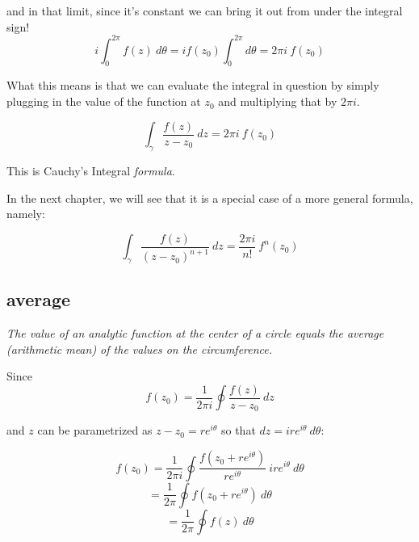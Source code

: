 \documentclass[11pt, oneside]{article}
\begin{document}
and in that limit, since it's constant we can bring it out from under the integral sign!
\[ i \int_0^{2\pi}  f(z) \ d \theta = i f(z_0) \int_0^{2\pi} d \theta = 2 \pi i \ f(z_0) \]

What this means is that we can evaluate the integral in question by simply plugging in the value of the function at $z_0$ and multiplying that by $2 \pi i$.

\[ \int_{\gamma} \frac{f(z)}{z - z_0} \ dz = 2 \pi i \ f(z_0) \]

This is Cauchy's Integral \emph{formula}.

In the next chapter, we will see that it is a special case of a more general formula, namely:

\[ \int_{\gamma} \frac{f(z)}{(z - z_0)^{n+1}} \ dz = \frac{2 \pi i}{n!} \ f^{n} (z_0) \]

\subsection*{average}

\emph{The value of an analytic function at the center of a circle equals the average (arithmetic mean) of the values on the circumference.}

Since
\[ f(z_0) = \frac{1}{2 \pi i} \oint \frac{f(z)}{z - z_0} \ dz \]

and $z$ can be parametrized as $z - z_0 = re^{i \theta}$ so that $dz = i r e^{i \theta} \ d \theta$:

\[ f(z_0) = \frac{1}{2 \pi i} \oint \frac{f(z_0 + re^{i \theta})}{re^{i \theta} } \ i r e^{i \theta} \ d \theta \]
\[ = \frac{1}{2 \pi} \oint f(z_0 + re^{i \theta}) \ d \theta \]
\[ = \frac{1}{2 \pi} \oint f(z) \ d \theta \]
\end{document}
